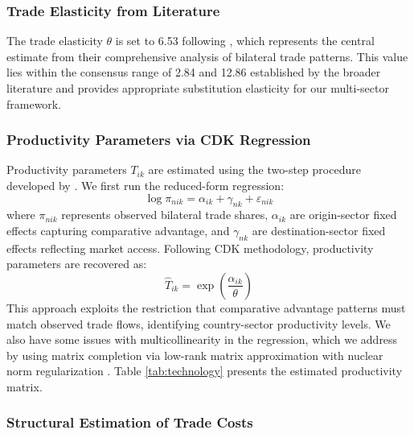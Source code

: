 \subsubsection{Trade Elasticity from Literature}

The trade elasticity $\theta$ is set to 6.53 following \cite{costinot2012TheReviewofEconomicStudies}, which represents the central estimate from their comprehensive analysis of bilateral trade patterns. This value lies within the consensus range of 2.84 and 12.86 established by the broader literature \citep{eaton2002Econometrica} and provides appropriate substitution elasticity for our multi-sector framework.

\subsubsection{Productivity Parameters via CDK Regression}

Productivity parameters $T_{ik}$ are estimated using the two-step procedure developed by \cite{costinot2012TheReviewofEconomicStudies}. We first run the reduced-form regression:
\begin{equation}
\log \pi_{nik} = \alpha_{ik} + \gamma_{nk} + \varepsilon_{nik}
\end{equation}
where $\pi_{nik}$ represents observed bilateral trade shares, $\alpha_{ik}$ are origin-sector fixed effects capturing comparative advantage, and $\gamma_{nk}$ are destination-sector fixed effects reflecting market access. Following CDK methodology, productivity parameters are recovered as:
\begin{equation}\hat{T}_{ik} = \exp\left(\frac{\hat{\alpha}_{ik}}{\theta}\right)
\end{equation}
This approach exploits the restriction that comparative advantage patterns must match observed trade flows, identifying country-sector productivity levels. We also have some issues with multicollinearity in the regression, which we address by using matrix completion via low-rank matrix approximation with nuclear norm regularization \citep{mazumder2010spectral}. Table \ref{tab:technology} presents the estimated productivity matrix.

\subsubsection{Structural Estimation of Trade Costs}

